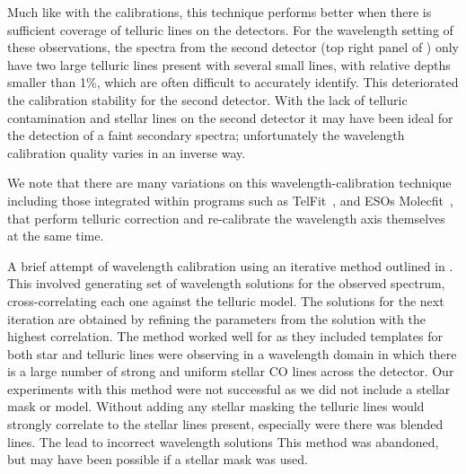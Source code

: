 Much like with the {\thar} calibrations, this technique performs better when there is sufficient coverage of telluric lines on the detectors. For the wavelength setting of these observations, the spectra from the second detector (top right panel of ) only have two large telluric lines present with several small lines, with relative depths smaller than 1\%, which are often difficult to accurately identify. This deteriorated the calibration stability for the second detector. With the lack of telluric contamination and stellar lines on the second detector it may have been ideal for the detection of a faint secondary spectra; unfortunately the wavelength calibration quality varies in an inverse way.


We note that there are many variations on this wavelength-calibration technique including those integrated within programs such as TelFit~\citet{gullikson_correcting_2014}, and ESOs Molecfit~\citet{smette_molecfit_2015}, that perform telluric correction and re-calibrate the wavelength axis themselves at the same time.


A brief attempt of wavelength calibration using an iterative method outlined in \cite{brogi_rotation_2016}. This involved generating set of wavelength solutions for the observed spectrum, cross-correlating each one against the telluric model. The solutions for the next iteration are obtained by refining the parameters from the solution with the highest correlation. 
The method worked well for \citet{brogi_rotation_2016} as they included templates for both star and telluric lines were observing in a wavelength domain in which there is a large number of strong and uniform stellar CO lines across the detector. 
Our experiments with this method were not successful as we did not include a stellar mask or model. Without adding any stellar masking the telluric lines would strongly correlate to the stellar lines present, especially were there was blended lines. The lead to incorrect wavelength solutions This method was abandoned, but may have been possible if a stellar mask was used.



